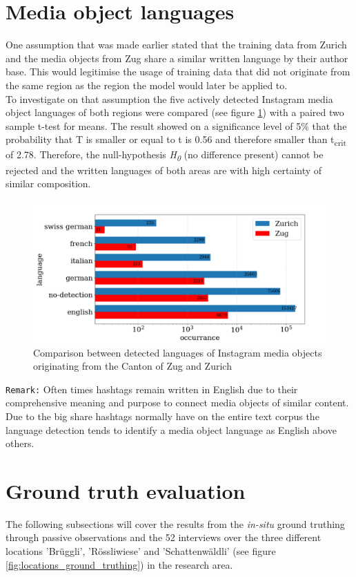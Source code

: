 \section{Media object languages}
One assumption that was made earlier stated that the training data from Zurich and the media objects from Zug share a similar written language by their author base. This would legitimise the usage of training data that did not originate from the same region as the region the model would later be applied to.\\
To investigate on that assumption the five actively detected Instagram media object languages of both regions were compared (see figure \ref{fig:det_languages}) with a paired two sample t-test for means. The result showed on a significance level of 5\% that the probability that T is smaller or equal to t is 0.56 and therefore smaller than t\textsubscript{crit} of 2.78. Therefore, the null-hypothesis \textit{H\textsubscript{0}} (no difference present) cannot be rejected and the written languages of both areas are with high certainty of similar composition.

\begin{figure}[h!]
   \centering
   \includegraphics[width=\textwidth]{img/det_languages_bigger_font.pdf}
   \caption{Comparison between detected languages of Instagram media objects originating from the Canton of Zug and Zurich}
   \label{fig:det_languages}
\end{figure}

\texttt{Remark:} Often times hashtags remain written in English due to their comprehensive meaning and purpose to connect media objects of similar content. Due to the big share hashtags normally have on the entire text corpus the language detection tends to identify a media object language as English above others.

\section{Ground truth evaluation}
The following subsections will cover the results from the \textit{in-situ} ground truthing through passive observations and the 52 interviews over the three different locations 'Br\"uggli', 'R\"ossliwiese' and 'Schattenw\"aldli' (see figure \ref{fig:locations_ground_truthing}) in the research area. \\

